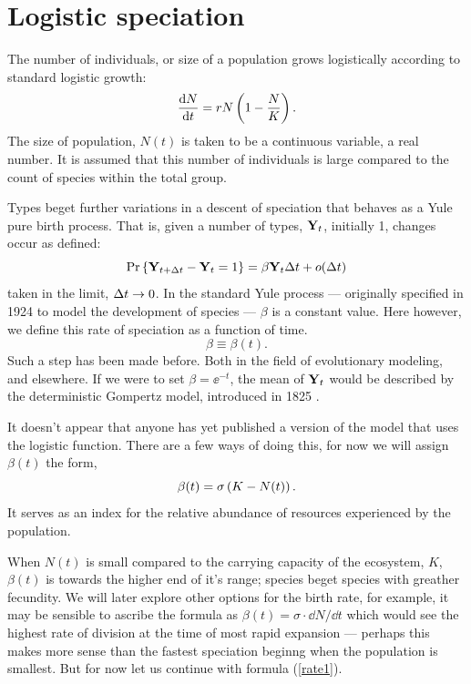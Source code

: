 \section{Logistic speciation}



The number of individuals, or size of a population grows logistically according to standard logistic growth:
$$\displaystyle\frac{{\rm d} N}{{\rm d} t} = rN\left(1-\frac{N}{K}\right).$$
The size of population, $N(t)$ is taken to be a continuous variable, a real number. It is assumed that this number of individuals is large compared to the count of species within the total group.\par

Types beget further variations in a descent of speciation that behaves as a Yule pure birth process. That is, given a number of types, ${{\bf Y}_t}$, initially 1, changes occur as defined: 
$${\text{Pr}\left\{{\bf Y}_{t+\Delta t} - {\bf Y}_t = 1\right\}} = \beta {\bf Y}_t \Delta t + o(\Delta t)$$
taken in the limit, $\Delta t\to 0$. In the standard Yule process --- originally specified in 1924 to model the development of species --- $\beta$ is a constant value. Here however, we define this rate of speciation as a function of time. 
$$\beta \equiv \beta(t).$$
Such a step has been made before. Both in the field of evolutionary modeling, and elsewhere. If we were to set $\beta = \ee^{-t}$, the mean of ${{\bf Y}_t}$ would be described by the deterministic Gompertz model, introduced in 1825 \cite{gompertz1825xxiv}.\par

It doesn't appear that anyone has yet published a version of the model that uses the logistic function. There are a few ways of doing this, for now we will assign $\beta(t)$ the form, 
\begin{equation}
\label{rate1}
\beta(t) = \sigma\left( K - N(t)\right).
\end{equation}
It serves as an index for the relative abundance of resources experienced by the population.\par

When $N(t)$ is small compared to the carrying capacity of the ecosystem, $K$, $\beta(t)$ is towards the higher end of it's range; species beget species with greather fecundity. We will later explore other options for the birth rate, for example, it may be sensible to ascribe the formula as $\beta(t) = \sigma\cdot \dd N/\dd t$ which would see the highest rate of division at the time of most rapid expansion --- perhaps this makes more sense than the fastest speciation beginng when the population is smallest. But for now let us continue with formula (\ref{rate1}). 

